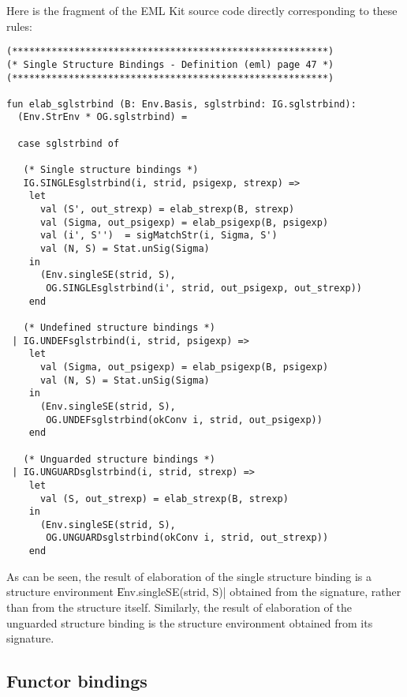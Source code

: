 Here is the fragment of the EML Kit source code directly corresponding to these rules:
{\small
\begin{verbatim}
(********************************************************)
(* Single Structure Bindings - Definition (eml) page 47 *)
(********************************************************)

fun elab_sglstrbind (B: Env.Basis, sglstrbind: IG.sglstrbind):
  (Env.StrEnv * OG.sglstrbind) =

  case sglstrbind of 

   (* Single structure bindings *)
   IG.SINGLEsglstrbind(i, strid, psigexp, strexp) =>
    let
      val (S', out_strexp) = elab_strexp(B, strexp)
      val (Sigma, out_psigexp) = elab_psigexp(B, psigexp)
      val (i', S'')  = sigMatchStr(i, Sigma, S')
      val (N, S) = Stat.unSig(Sigma)
    in
      (Env.singleSE(strid, S),
       OG.SINGLEsglstrbind(i', strid, out_psigexp, out_strexp))
    end

   (* Undefined structure bindings *)
 | IG.UNDEFsglstrbind(i, strid, psigexp) =>
    let
      val (Sigma, out_psigexp) = elab_psigexp(B, psigexp)
      val (N, S) = Stat.unSig(Sigma)
    in
      (Env.singleSE(strid, S),
       OG.UNDEFsglstrbind(okConv i, strid, out_psigexp))
    end

   (* Unguarded structure bindings *)
 | IG.UNGUARDsglstrbind(i, strid, strexp) =>
    let
      val (S, out_strexp) = elab_strexp(B, strexp)
    in
      (Env.singleSE(strid, S),
       OG.UNGUARDsglstrbind(okConv i, strid, out_strexp))
    end
\end{verbatim}
}
\noindent
As can be seen, the result of elaboration of the single structure binding
is a structure environment \|Env.singleSE(strid, S)| obtained from the signature, 
rather than from the structure itself. Similarly, the result of elaboration of 
the unguarded structure binding is the structure environment obtained from its signature.

\subsection{Functor bindings}
\label{sec:funct_bind}

